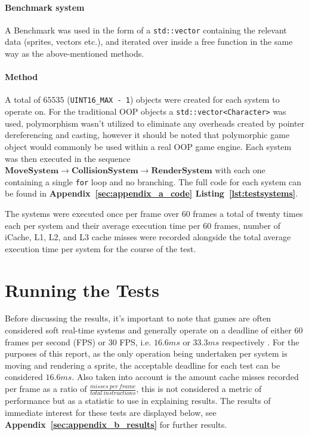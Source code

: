 \documentclass[10pt]{scrartcl}
\begin{document}
	
	\paragraph{Benchmark system} %
	\label{par:Benchmark_system}
	A Benchmark was used in the form of a \texttt{std::vector} containing the relevant data (sprites, vectors etc.), and iterated over inside a free function in the same way as the above-mentioned methods.

	\paragraph{Method} %
	\label{par:method}
	A total of $65535$ (\texttt{UINT16_MAX - 1}) objects were created for each system to operate on. For the traditional OOP objects a \texttt{std::vector<Character>} was used, polymorphism wasn't utilized to eliminate any overheads created by pointer dereferencing and casting, however it should be noted that polymorphic game object would commonly be used within a real OOP game engine. Each system was then executed in the sequence $\mathbf{MoveSystem} \rightarrow \mathbf{CollisionSystem} \rightarrow \mathbf{RenderSystem}$ with each one containing a single \texttt{for} loop and no branching. The full code for each system can be found in \textbf{Appendix~\ref{sec:appendix_a_code} Listing~\ref{lst:testsystems}}.

	The systems were executed once per frame over 60 frames a total of twenty times each per system and their average execution time per 60 frames, number of iCache, L1, L2, and L3 cache misses were recorded alongside the total average execution time per system for the course of the test.
	


	\section{Running the Tests} %
	\label{sec:results}
	Before discussing the results, it's important to note that games are often considered soft real-time systems and generally operate on a deadline of either 60 frames per second (FPS) or 30 FPS, i.e. $16.6ms$ or $33.3ms$ respectively \parencite[152]{gregory-cpp-usage}. For the purposes of this report, as the only operation being undertaken per system is moving and rendering a sprite, the acceptable deadline for each test can be considered $16.6ms$. Also taken into account is the amount cache misses recorded per frame as a ratio of $\frac{misses \ per \ frame}{total \ instructions}$, this is not considered a metric of performance but as a statistic to use in explaining results. The results of immediate interest for these tests are displayed below, see \textbf{Appendix~\ref{sec:appendix_b_results}} for further results.
\end{document}
